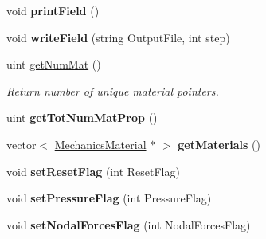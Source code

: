 \begin{DoxyCompactItemize}
\item 
\hypertarget{classvoom_1_1_mechanics_model_a480eb55c51af65ab16e8ecfb3861645e}{
void {\bfseries printField} ()}
\label{classvoom_1_1_mechanics_model_a480eb55c51af65ab16e8ecfb3861645e}

\item 
\hypertarget{classvoom_1_1_mechanics_model_af8488e5428ce3dc4e1fb8edb8d3a4c9f}{
void {\bfseries writeField} (string OutputFile, int step)}
\label{classvoom_1_1_mechanics_model_af8488e5428ce3dc4e1fb8edb8d3a4c9f}

\item 
\hypertarget{classvoom_1_1_mechanics_model_aca42881f09a84c766baf127d45f2fef8}{
uint \hyperlink{classvoom_1_1_mechanics_model_aca42881f09a84c766baf127d45f2fef8}{getNumMat} ()}
\label{classvoom_1_1_mechanics_model_aca42881f09a84c766baf127d45f2fef8}

\begin{DoxyCompactList}\small\item\em Return number of unique material pointers. \item\end{DoxyCompactList}\item 
\hypertarget{classvoom_1_1_mechanics_model_a10c046adfe42363ef28fb39009269d8e}{
uint {\bfseries getTotNumMatProp} ()}
\label{classvoom_1_1_mechanics_model_a10c046adfe42363ef28fb39009269d8e}

\item 
\hypertarget{classvoom_1_1_mechanics_model_a343ac46fc7ada32bf24f7be43410888e}{
vector$<$ \hyperlink{classvoom_1_1_mechanics_material}{MechanicsMaterial} $\ast$ $>$ {\bfseries getMaterials} ()}
\label{classvoom_1_1_mechanics_model_a343ac46fc7ada32bf24f7be43410888e}

\item 
\hypertarget{classvoom_1_1_mechanics_model_a312307b64a3f4f7bd80bc78afd923728}{
void {\bfseries setResetFlag} (int ResetFlag)}
\label{classvoom_1_1_mechanics_model_a312307b64a3f4f7bd80bc78afd923728}

\item 
\hypertarget{classvoom_1_1_mechanics_model_aaba33b2bbd0ebc2f01f5ce69dec85b95}{
void {\bfseries setPressureFlag} (int PressureFlag)}
\label{classvoom_1_1_mechanics_model_aaba33b2bbd0ebc2f01f5ce69dec85b95}

\item 
\hypertarget{classvoom_1_1_mechanics_model_ae1e2bf7e69ad5d70d6516c83bd13b399}{
void {\bfseries setNodalForcesFlag} (int NodalForcesFlag)}
\label{classvoom_1_1_mechanics_model_ae1e2bf7e69ad5d70d6516c83bd13b399}


\end{DoxyCompactItemize}
